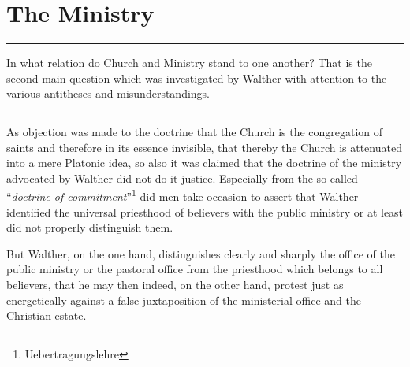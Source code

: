 \chapter{The Ministry}

\hrule
\vspace{.30cm}
In what relation do Church and Ministry stand to one another?  That is the second main question which was investigated by Walther with attention to the various antitheses and misunderstandings.
\vspace{.30cm}
\hrule
\vspace{1.25cm}
                As objection was made to the doctrine that the Church is the congregation of saints and therefore in its essence invisible, that thereby the Church is attenuated into a mere Platonic idea, so also it was claimed that the doctrine of the ministry advocated by Walther did not do it justice.  Especially from the so-called “\textit{doctrine of commitment}”\footnote{Uebertragungslehre} did men take occasion to assert that Walther identified the universal priesthood of believers with the public ministry or at least did not properly distinguish them.

                But Walther, on the one hand, distinguishes clearly and sharply the office of the public ministry or the pastoral office from the priesthood which belongs to all believers, that he may then indeed, on the other hand, protest just as energetically against a false juxtaposition of the ministerial office and the Christian estate.

